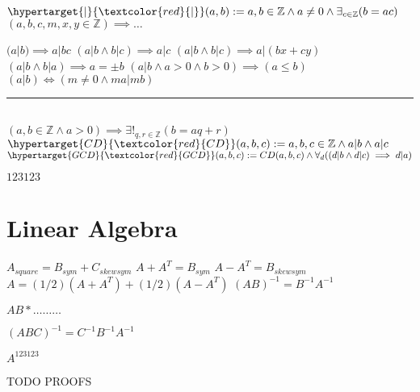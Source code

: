 \documentclass{book}
\newcommand{\df}[1]{\hypertarget{#1}{\textcolor{red}{#1}}}
\newcommand{\wff}[1]{\hypertarget{#1}{\fbox{\textcolor{red}{$#1$}}\phantom{--}}}
\newcommand{\abr}{:=}
\begin{document}
$\df{|}(a, b) \abr a, b \in \mathbb{Z} \land a \neq 0 \land \exists_{c \in \mathbb{Z}}(b = a c)$ \\

\wff{Divisibility Theorems} $(a, b, c, m, x, y \in \mathbb{Z}) \implies \ldots$
\begin{enumerate}
  \lit $(a | b) \implies a | b c$
  \lit $(a | b \land b | c) \implies a | c$
  \lit $(a | b \land b | c) \implies a | (b x + c y)$
  \lit $(a | b \land b | a) \implies a = \pm b$
  \lit $(a | b \land a > 0 \land b > 0) \implies (a \leq b)$
  \lit $(a | b) \iff (m \neq 0 \land m a | m b)$
\end{enumerate} \vspace{.75mm} \hrule \vspace{.75mm} \ \\ 

\wff{Division Algorithm} $(a, b \in \mathbb{Z} \land a > 0) \implies \exists!_{q, r \in \mathbb{Z}}(b = a q + r)$ \\

$\df{CD}(a, b, c) \abr a, b, c \in \mathbb{Z} \land a | b \land a | c$ \\
$\df{GCD}(a, b, c) \abr CD(a, b, c) \land \forall_{d}((d | b \land d | c) \implies d | a)$

\wff{GCD Equivalent} $123123$

\chapter{Linear Algebra}
$A_{square}  = B_{sym} + C_{skewsym}$
$A + A^T = B_{sym}$
$A - A^T = B_{skewsym}$
$A = (1/2) (A + A^T) + (1/2) (A - A^T)$
$(A B)^{-1} = B^{-1} A^{-1}$

$A B * \ldots \ldots \ldots$

$(A B C)^{-1} = C^{-1} B^{-1} A^{-1}$

$A^123123$

TODO PROOFS


\end{document}
